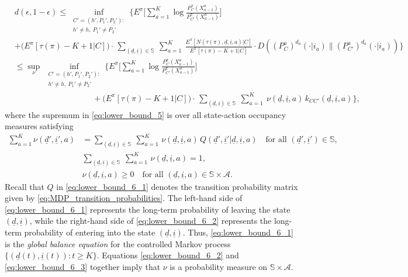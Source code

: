 \begingroup \allowdisplaybreaks\begin{align}
	&d(\epsilon,1-\epsilon)\leq \inf\limits_{\substack{C'=(h', P_1', P_2'):\\h'\neq h, ~P_1'\neq P_2'}}\bigg\lbrace E^\pi\bigg[\sum\limits_{a=1}^{K} \log\frac{P^\pi_C(X_{a-1}^a)}{P^\pi_{C'}(X_{a-1}^a)}\bigg]\nonumber\\
	&+ \bigg(E^\pi[\tau(\pi)-K+1|C]\bigg)\cdot\,\sum\limits_{(\underline{d},\underline{i})\in\mathbb{S}}~\sum\limits_{a=1}^{K}~\frac{E^\pi[N(\tau(\pi),\underline{d},\underline{i},a)|C]}{E^\pi[\tau(\pi)-K+1|C]}\cdot D((P_C^a)^{d_a}(\cdot|i_a)\|(P_{C'}^a)^{d_a}(\cdot|i_a))\bigg\rbrace\nonumber\\
	&\leq \sup\limits_{\nu}\,\inf\limits_{\substack{C'=(h', P_1', P_2'):\\h'\neq h, ~P_1'\neq P_2'}}\bigg\lbrace E^\pi\bigg[\sum\limits_{a=1}^{K} \log\frac{P^\pi_C(X_{a-1}^a)}{P^\pi_{C'}(X_{a-1}^a)}\bigg]\nonumber\\
	&\hspace{4cm}+\bigg(E^\pi[\tau(\pi)-K+1|C]\bigg)\cdot\,\sum\limits_{(\underline{d},\underline{i})\in\mathbb{S}}~\sum\limits_{a=1}^{K}~\nu(\underline{d},\underline{i},a)\, k_{CC'}(\underline{d}, \underline{i}, a)\bigg\rbrace,\label{eq:lower_bound_5}
\end{align}\endgroup
where the supremum in \eqref{eq:lower_bound_5} is over all state-action occupancy measures satisfying
\begin{align}
	\sum\limits_{a=1}^{K}\nu(\underline{d}',\underline{i}',a)&=\sum\limits_{(\underline{d},\underline{i})\in\mathbb{S}}~\sum\limits_{a=1}^{K}\,\nu(\underline{d},\underline{i},a)\,Q(\underline{d}',\underline{i}'|\underline{d},\underline{i},a)\quad \text{for all }(\underline{d}',\underline{i}')\in\mathbb{S},\label{eq:lower_bound_6_1}\\
	&\sum\limits_{(\underline{d},\underline{i})\in\mathbb{S}}~\sum\limits_{a=1}^{K}\,\nu(\underline{d},\underline{i},a)=1,\label{eq:lower_bound_6_2}\\
	&\nu(\underline{d},\underline{i},a)\geq 0\quad \text{for all }(\underline{d},\underline{i},a)\in\mathbb{S}\times\mathcal{A}.\label{eq:lower_bound_6_3}
\end{align}
Recall that $Q$ in \eqref{eq:lower_bound_6_1} denotes the transition probability matrix given by	 \eqref{eq:MDP_transition_probabilities}. The left-hand side of \eqref{eq:lower_bound_6_1} represents the long-term probability of leaving the state $(\underline{d},\underline{i})$, while the right-hand side of \eqref{eq:lower_bound_6_2} represents the long-term probability of entering into the state $(\underline{d},\underline{i})$. Thus, \eqref{eq:lower_bound_6_1} is the \emph{global balance equation} for the controlled Markov process $\{(\underline{d}(t),\underline{i}(t)):t\geq K\}$. Equations \eqref{eq:lower_bound_6_2} and \eqref{eq:lower_bound_6_3} together imply that $\nu$ is a probability measure on $\mathbb{S}\times\mathcal{A}$.

